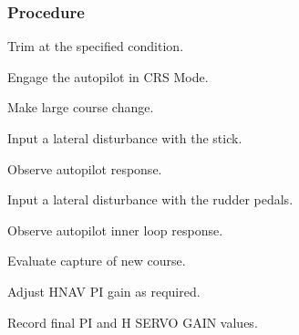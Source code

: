 \subsubsection*{Procedure}
 \begin{compactenum}
    \item Trim at the specified condition.
    \item Engage the autopilot in CRS Mode.
    \item Make large course change.
    \item Input a lateral disturbance with the stick.  
    \item Observe autopilot response.
    \item Input a lateral disturbance with the rudder pedals.  
    \item Observe autopilot inner loop response.
    \item Evaluate capture of new course.
    \item Adjust HNAV PI gain as required.
    \item Record final PI and H SERVO GAIN values.
    \end{compactenum}
